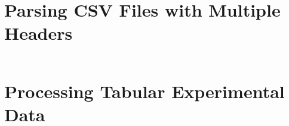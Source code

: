 \documentclass[a4paper, oneside]{memoir}
\begin{document}
\section{Parsing CSV Files with Multiple Headers}
\label{a:eval:collection:future:header:py}
\inputminted[fontsize=\normalsize,firstline=7,lastline=35]{python}{../src/csvheader.py}

\section{Processing Tabular Experimental Data}
\label{a:eval:collection:tabular:py}
\inputminted[fontsize=\normalsize]{python}{../src/tabulardata.py}

\printbibliography

\printindex
\end{document}
